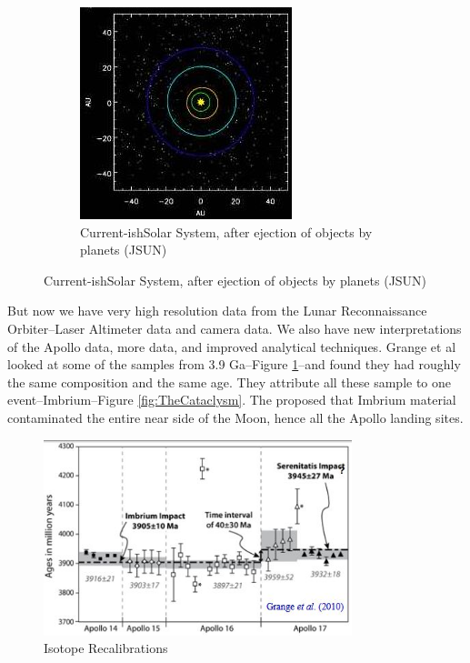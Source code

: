 \documentclass[]{article}
\begin{document}
\begin{figure}[H]
\begin{subfigure}[b]{0.3\textwidth}
	\end{subfigure}
	\begin{subfigure}[b]{0.3\textwidth}
		\caption{Current-ishSolar System, after ejection of objects by planets (JSUN)}
		\includegraphics[width=\textwidth]{Nice3}
	\end{subfigure}
\end{figure}

But now we have very high resolution data from the Lunar Reconnaissance Orbiter--Laser Altimeter data and camera data. We also have new interpretations of the Apollo data, more data, and improved analytical techniques. Grange et al looked at some of the samples from 3.9 Ga--Figure \ref{fig:IsotopeRecalibrations}--and found they had roughly the same composition and the same age. They attribute all these sample to one event--Imbrium--Figure \ref{fig:TheCataclysm}. The proposed that Imbrium material contaminated the entire near side of the Moon, hence all the Apollo landing sites.
\begin{figure}[H]
	\caption{Isotope Recalibrations}\label{fig:IsotopeRecalibrations}
	\includegraphics[width=0.8\textwidth]{IsotopeRecalibrations}
\end{figure}
\end{document}
